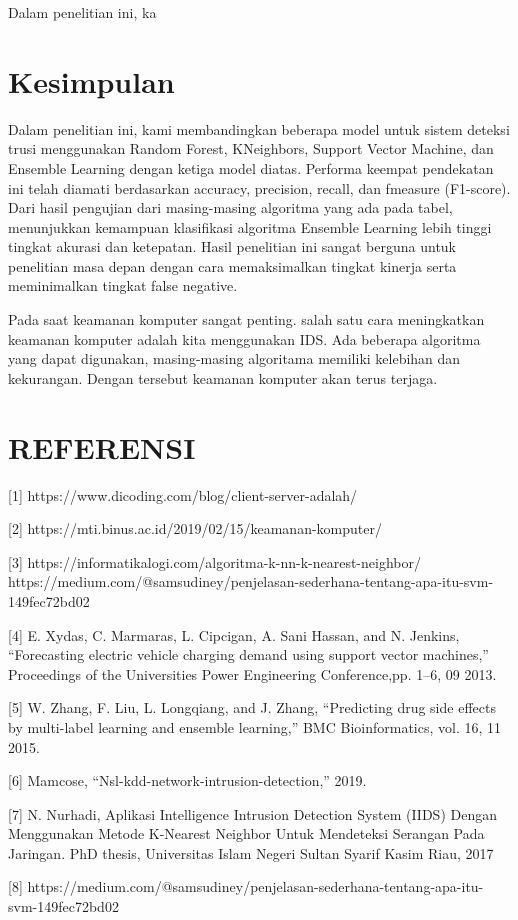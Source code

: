 \documentclass[conference]{IEEEtran}
\begin{document}
Dalam penelitian ini, ka

\section{Kesimpulan}

Dalam penelitian ini, kami membandingkan beberapa model
untuk sistem deteksi trusi menggunakan Random Forest, KNeighbors, Support Vector Machine, dan Ensemble Learning
dengan ketiga model diatas. Performa keempat pendekatan ini
telah diamati berdasarkan accuracy, precision, recall, dan fmeasure (F1-score).
Dari hasil pengujian dari masing-masing algoritma yang
ada pada tabel, menunjukkan kemampuan klasifikasi algoritma
Ensemble Learning lebih tinggi tingkat akurasi dan ketepatan.
Hasil penelitian ini sangat berguna untuk penelitian masa
depan dengan cara memaksimalkan tingkat kinerja serta meminimalkan tingkat false negative.

Pada saat keamanan komputer sangat penting. salah satu
cara meningkatkan keamanan komputer adalah kita menggunakan IDS. Ada beberapa algoritma yang dapat digunakan,
masing-masing algoritama memiliki kelebihan dan kekurangan. Dengan tersebut keamanan komputer akan terus terjaga.


\section*{REFERENSI}

[1] https://www.dicoding.com/blog/client-server-adalah/

[2] https://mti.binus.ac.id/2019/02/15/keamanan-komputer/

[3] https://informatikalogi.com/algoritma-k-nn-k-nearest-neighbor/
https://medium.com/@samsudiney/penjelasan-sederhana-tentang-apa-itu-svm-149fec72bd02

[4] E. Xydas, C. Marmaras, L. Cipcigan, A. Sani Hassan, and N. Jenkins,
“Forecasting electric vehicle charging demand using support vector machines,” Proceedings of the Universities Power Engineering Conference,pp. 1–6, 09 2013.

[5] W. Zhang, F. Liu, L. Longqiang, and J. Zhang, “Predicting drug side
effects by multi-label learning and ensemble learning,” BMC Bioinformatics, vol. 16, 11 2015.

[6] Mamcose, “Nsl-kdd-network-intrusion-detection,” 2019.

[7] N. Nurhadi, Aplikasi Intelligence Intrusion Detection System (IIDS)
Dengan Menggunakan Metode K-Nearest Neighbor Untuk Mendeteksi
Serangan Pada Jaringan. PhD thesis, Universitas Islam Negeri Sultan
Syarif Kasim Riau, 2017

[8] https://medium.com/@samsudiney/penjelasan-sederhana-tentang-apa-itu-svm-149fec72bd02
\end{document}
